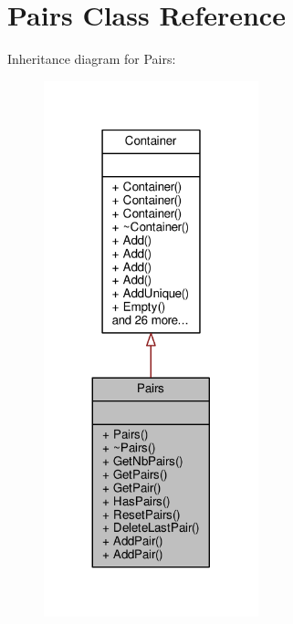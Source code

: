\hypertarget{classPairs}{}\section{Pairs Class Reference}
\label{classPairs}


Inheritance diagram for Pairs\+:
\nopagebreak
\begin{figure}[H]
\begin{center}
\leavevmode
\includegraphics[width=176pt]{dc/d08/classPairs__inherit__graph}
\end{center}
\end{figure}



